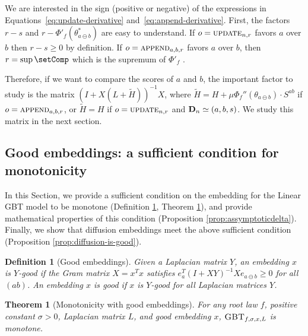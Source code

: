 \documentclass{article}
\DeclareMathOperator*{\append}{\textsc{append}}
\DeclareMathOperator*{\update}{\textsc{update}}
\newtheorem{definition}{Definition}
\newtheorem{theorem}{Theorem}
\newcommand{\GBT}{\textsc{GBT}}
\newcommand{\bD}{{\bf D}}
\newcommand{\ab}{a\ominus{} b}
\begin{document}
We are interested in the sign (positive or negative) of the expressions
in Equations~\eqref{eq:update-derivative} and~\eqref{eq:append-derivative}.
First, the factors $r - s$ 
and $r - \Phi'_f(\theta^*_{\ab})$ are easy to understand.
If $o = \update_{n, r}$ favors $a$ over $b$ then $r - s \ge 0$ by definition.
If $o = \append_{a, b, r}$ favors $a$ over $b$,
then $r = \sup \setComp$ which is the supremum of $\Phi'_f$ \cite[Theorem 1]{DBLP:conf/aaai/FageotFHV24}.

Therefore, if we want to compare the scores of $a$ and $b$, the important factor to study is the matrix $(I + X(L + \tilde{H}))^{-1}X$, where $\tilde{H} = H + \mu \Phi_f''(\theta_{\ab}) \cdot S^{ab}$ if $o = \append_{a, b, r}$, or $\tilde{H} = H$ if $o = \update_{n, r}$ and $\bD_n \simeq (a, b, s)$.
We study this matrix in the next section.








\subsection{Good embeddings: a sufficient condition for monotonicity}
\label{sec:monotproofemb}







In this Section, we provide a sufficient condition on the embedding for the Linear GBT model to be monotone (Definition \ref{def:good-embeddings}, Theorem \ref{th:monotonicity-with-good-embeddings}), and provide mathematical properties of this condition (Proposition \ref{prop:assymptoticdelta}). 
Finally, we show that diffusion embeddings meet the above sufficient condition (Proposition \ref{prop:diffusion-is-good}).

\begin{definition}[Good embeddings]
    Given a Laplacian matrix $Y$, 
    an embedding $x$ is \emph{$Y$-good}
    if the Gram matrix $X =  x^Tx$
    satisfies $e_a^T (I + XY)^{-1}X e_{\ab{}} \ge 0$ for all $(ab)$.
    An embedding $x$ is \emph{good} if $x$ is $Y$-good 
    for all Laplacian matrices $Y$.
    \label{def:good-embeddings}
\end{definition}



\begin{theorem}[Monotonicity with good embeddings]
    \label{th:monotonicity-with-good-embeddings}
    For any root law $f$, positive constant $\sigma > 0$, 
    Laplacian matrix $L$, and good embedding $x$,
    $\GBT_{f,\sigma,x,L}$ is monotone.
\end{theorem}
\end{document}

